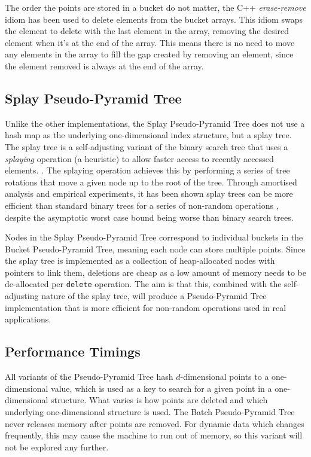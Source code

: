 The order the points are stored in a bucket do not matter, the C++ \textit{erase-remove} idiom has been used to delete elements from the bucket arrays. This idiom swaps the element to delete with the last element in the array, removing the desired element when it's at the end of the array. This means there is no need to move any elements in the array to fill the gap created by removing an element, since the element removed is always at the end of the array.

\subsection{Splay Pseudo-Pyramid Tree}

Unlike the other implementations, the Splay Pseudo-Pyramid Tree does not use a hash map as the underlying one-dimensional index structure, but a splay tree. The splay tree is a self-adjusting variant of the binary search tree that uses a \textit{splaying} operation (a heuristic) to allow faster access to recently accessed elements. \cite{splay-tree}. The splaying operation achieves this by performing a series of tree rotations that move a given node up to the root of the tree. Through amortised analysis and empirical experiments, it has been shown splay trees can be more efficient than standard binary trees for a series of non-random operations \cite{splay-tree}, despite the asymptotic worst case bound being worse than binary search trees.

Nodes in the Splay Pseudo-Pyramid Tree correspond to individual buckets in the Bucket Pseudo-Pyramid Tree, meaning each node can store multiple points. Since the splay tree is implemented as a collection of heap-allocated nodes with pointers to link them, deletions are cheap as a low amount of memory needs to be de-allocated per \texttt{delete} operation. The aim is that this, combined with the self-adjusting nature of the splay tree, will produce a Pseudo-Pyramid Tree implementation that is more efficient for non-random operations used in real applications.

\subsection{Performance Timings}

All variants of the Pseudo-Pyramid Tree hash $d$-dimensional points to a one-dimensional value, which is used as a key to search for a given point in a one-dimensional structure. What varies is how points are deleted and which underlying one-dimensional structure is used. The Batch Pseudo-Pyramid Tree never releases memory after points are removed. For dynamic data which changes frequently, this may cause the machine to run out of memory, so this variant will not be explored any further.

